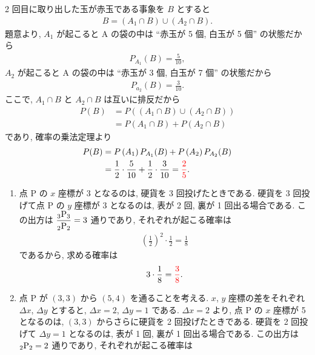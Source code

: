 \begin{qenumerate}
{		2 回目に取り出した玉が赤玉である事象を $B$ とすると
		\begin{align}
			B = \left(A_{1}\cap B\right)\cup\left(A_{2}\cap B\right).
		\end{align}
		題意より, $A_{1}$ が起こると A の袋の中は ``赤玉が 5 個, 白玉が 5 個'' の状態だから
		\begin{align}
			P_{A_{1}}(B) = \frac{5}{10}, 
		\end{align}
		$A_{2}$ が起こると A の袋の中は ``赤玉が 3 個, 白玉が 7 個'' の状態だから
		\begin{align}
			P_{a_{2}}(B) = \frac{3}{10}.
		\end{align}
		ここで, $A_{1}\cap B$ と $A_{2}\cap B$ は互いに排反だから
		\begin{align}
			P(B) &= P\left(\left(A_{1}\cap B\right)\cup\left(A_{2}\cap B\right)\right) \\
				&= P\left(A_{1}\cap B\right) + P\left(A_{2}\cap B\right)
		\end{align}
		であり, 確率の乗法定理より
		\begin{align}
			P(B) &= P\left(A_{1}\right)P_{A_{1}}(B) + P\left(A_{2}\right)P_{A_{2}}(B) \\
				&=\frac{1}{2}\cdot\frac{5}{10} + \frac{1}{2}\cdot\frac{3}{10} = \textcolor{red}{\frac{2}{5}}.
		\end{align}
	}
	\item{
		\begin{enumerate}
			\item{
				点 P の $x$ 座標が 3 となるのは, 硬貨を 3 回投げたときである.
				硬貨を 3 回投げて点 P の $y$ 座標が 3 となるのは, 表が 2 回, 裏が 1 回出る場合である.
				この出方は $\dfrac{{{}_{3}\mathrm{P}_{3}}}{{{}_{2}\mathrm{P}_{2}}} = 3$ 通りであり, それぞれが起こる確率は
				\begin{align}
					\left(\frac{1}{2}\right)^{2}\cdot\frac{1}{2} = \frac{1}{8}
				\end{align}
				であるから, 求める確率は
				\begin{align}
					3\cdot\frac{1}{8} = \textcolor{red}{\frac{3}{8}}.
				\end{align}
			}
			\item{
				点 P が $(3, 3)$ から $(5, 4)$ を通ることを考える.
				$x$, $y$ 座標の差をそれぞれ $\Delta x$, $\Delta y$ とすると, $\Delta x = 2$, $\Delta y = 1$ である.
				$\Delta x = 2$ より, 点 P の $x$ 座標が 5 となるのは, $(3, 3)$ からさらに硬貨を 2 回投げたときである.
				硬貨を 2 回投げて $\Delta y = 1$ となるのは, 表が 1 回, 裏が 1 回出る場合である.
				この出方は ${{}_{2}\mathrm{P}_{2}} = 2$ 通りであり, それぞれが起こる確率は
}
\end{enumerate}}
\end{qenumerate}
